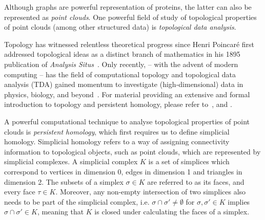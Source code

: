 Although graphs are powerful representation of proteins, the latter can also be
represented as \emph{point clouds}. One powerful field of study of topological
properties of point clouds (among other structured data) is \emph{topological
data analysis}.

Topology has witnessed relentless theoretical progress since Henri Poincar\'e
first addressed topological ideas as a distinct branch of mathematics in his
1895 publication of \textit{Analysis Situs}~\citep{poincare1895analysis}. Only
recently, -- with the advent of modern computing -- has the field of
computational topology and topological data analysis (TDA) gained momentum to
investigate (high-dimensional) data in physics, biology, and
beyond~\citep{dey1999computational, ghrist2008barcodes, amezquita2020shape}. For
material providing an extensive and formal introduction to topology and
persistent homology, please refer to~\citep{freedman2009algebraic,
edelsbrunner2010computational}, and \citep{ghrist2008barcodes}.

A powerful computational technique to analyse topological properties of point
clouds is \emph{persistent homology}, which first requires us to define
simplicial homology. Simplicial homology refers to a way of assigning
connectivity information to topological objects, such as point clouds, which are
represented by simplicial complexes. A simplicial complex $K$ is a set of
simplices which correspond to vertices in dimension 0, edges in dimension 1 and
triangles in dimension 2. The subsets of a simplex $\sigma\in K$ are referred to
as its faces, and every face $\tau\in K$. Moreover, any non-empty intersection
of two simplices also needs to be part of the simplicial complex, i.e.
$\sigma\cap\sigma '\neq\emptyset$ for $\sigma,\sigma '\in K$ implies
$\sigma\cap\sigma'\in K$, meaning that $K$ is closed under calculating the faces
of a simplex.

